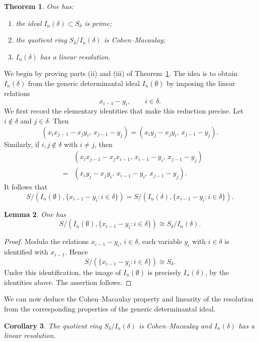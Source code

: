 \documentclass[12pt]{amsart}
\newtheorem{Theorem}{Theorem}[section]
\newtheorem{Lemma}[Theorem]{Lemma}
\newtheorem{Corollary}[Theorem]{Corollary}
\begin{document}
\begin{Theorem}\label{prime+CM+linear}
One has:
\begin{enumerate}
\item[(i)] the ideal $I_n(\delta)\subset S_\delta$ is prime;
\item[(ii)] the quotient ring $S_\delta/I_n(\delta)$ is Cohen--Macaulay;
\item[(iii)] $I_n(\delta)$ has a linear resolution.
\end{enumerate}
\end{Theorem}

We begin by proving parts (ii) and (iii) of
Theorem~\ref{prime+CM+linear}. The idea is to obtain
$I_n(\delta)$ from the generic determinantal ideal $I_n(\emptyset)$
by imposing the linear relations
\[
x_{i-1}-y_i,\qquad i\in\delta.
\]
We first record the elementary identities that make this reduction precise. Let $i\notin\delta$ and $j\in\delta$. Then
\[
(x_i x_{j-1}-x_jy_i,\,x_{j-1}-y_j)
=
(x_i y_j-x_jy_i,\,x_{j-1}-y_j).
\]
Similarly, if $i,j\notin\delta$ with $i\neq j$, then
\begin{eqnarray*}
&&
(x_i x_{j-1}-x_jx_{i-1},\,
  x_{i-1}-y_i,\,
  x_{j-1}-y_j)
\\
&=&
(x_i y_j-x_jy_i,\,
  x_{i-1}-y_i,\,
  x_{j-1}-y_j).
\end{eqnarray*}
It follows that
\[
S/(I_n(\emptyset),\{x_{i-1}-y_i:i\in\delta\})
=
S/(I_n(\delta),\{x_{i-1}-y_i:i\in\delta\}).
\]

\begin{Lemma}
\label{regular_sequence}
One has
\[
S/(I_n(\emptyset),\{x_{i-1}-y_i:i\in\delta\})
\cong S_\delta/I_n(\delta).
\]
\end{Lemma}

\begin{proof}
Modulo the relations $x_{i-1}-y_i$, $i\in\delta$, each variable
$y_i$ with $i\in\delta$ is identified with $x_{i-1}$. Hence
\[
S/(\{x_{i-1}-y_i:i\in\delta\})\cong S_\delta.
\]
Under this identification, the image of $I_n(\emptyset)$ is precisely
$I_n(\delta)$, by the identities above. The assertion follows.
\end{proof}

We can now deduce the Cohen--Macaulay property and linearity of the
resolution from the corresponding properties of the generic
determinantal ideal.

\begin{Corollary}
\label{CM_linear}
The quotient ring $S_\delta/I_n(\delta)$ is Cohen--Macaulay and
$I_n(\delta)$ has a linear resolution.
\end{Corollary}
\end{document}
